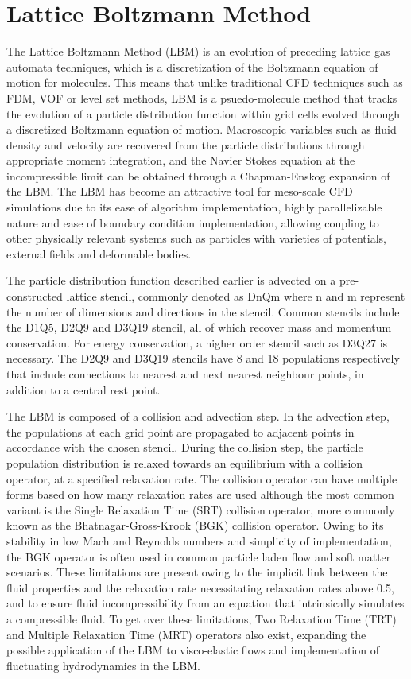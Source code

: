 \section{Lattice Boltzmann Method}

The Lattice Boltzmann Method (LBM) is an evolution of preceding lattice gas automata techniques, which is a discretization of the Boltzmann equation of motion for 
molecules. This means that unlike traditional CFD techniques such as FDM, VOF or level set methods, LBM is a psuedo-molecule method that tracks the evolution of a 
particle distribution function within grid cells evolved through a discretized Boltzmann equation of motion. Macroscopic variables such as fluid density and 
velocity are recovered from the particle distributions through appropriate moment integration, and the Navier Stokes equation at the incompressible limit can be 
obtained through a Chapman-Enskog expansion of the LBM. The LBM has become an attractive tool for meso-scale CFD simulations due to its ease of algorithm 
implementation, highly parallelizable nature and ease of boundary condition implementation, allowing coupling to other physically relevant systems such as 
particles with varieties of potentials, external fields and deformable bodies.

The particle distribution function described earlier is advected on a pre-constructed lattice stencil, commonly denoted as DnQm where n and m represent the 
number of dimensions and directions in the stencil. Common stencils include the D1Q5, D2Q9 and D3Q19 stencil, all of which recover mass and momentum conservation. 
For energy conservation, a higher order stencil such as D3Q27 is necessary. The D2Q9 and D3Q19 stencils have 8 and 18 populations respectively that include 
connections to nearest and next nearest neighbour points, in addition to a central rest point. 

The LBM is composed of a collision and advection step. In the advection step, the populations at each grid point are propagated to adjacent points in accordance 
with the chosen stencil. During the collision step, the particle population distribution is relaxed towards an equilibrium with a collision operator, at a 
specified relaxation rate. The collision operator can have multiple forms based on how many relaxation rates are used although the most common variant is the 
Single Relaxation Time (SRT) collision operator, more commonly known as the Bhatnagar-Gross-Krook (BGK) collision operator. Owing to its stability in low Mach 
and Reynolds numbers and simplicity of implementation, the BGK operator is often used in common particle laden flow and soft matter scenarios. 
\cite{bhatnagar_model_1954} These limitations are present owing to the implicit link between the fluid properties and the relaxation rate necessitating 
relaxation rates above 0.5, and to ensure fluid incompressibility from an equation that intrinsically simulates a compressible fluid. To get over these 
limitations, Two Relaxation Time (TRT) and Multiple Relaxation Time (MRT) operators also exist, expanding the possible application of the LBM to visco-elastic 
flows and implementation of fluctuating hydrodynamics in the LBM. \cite{liu_simulation_2023, adhikari_fluctuating_2005}

